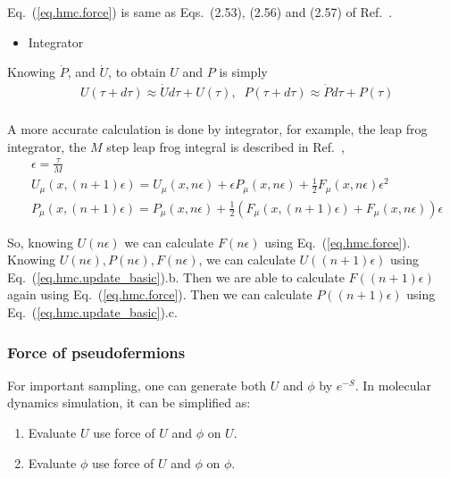 Eq.~(\ref{eq.hmc.force}) is same as Eqs.~(2.53), (2.56) and (2.57) of Ref.~\cite{latticeqcdbook2017}.

\begin{itemize}
\item {}Integrator
\end{itemize}

Knowing $\dot{P}$, and $\dot {U}$, to obtain $U$ and $P$ is simply
\begin{equation}
\begin{split}
&U(\tau+d\tau)\approx \dot{U}d\tau + U(\tau),\;\;P(\tau+d\tau)\approx \dot{P}d\tau + P(\tau)\\
\end{split}
\end{equation}

A more accurate calculation is done by integrator, for example, the leap frog integrator, the $M$ step leap frog integral is described in Ref.~\cite{latticeqcdbook2010},
\begin{subequations}
\begin{eqnarray}
&\epsilon = \frac{\tau}{M}\\
&U_{\mu}(x,(n+1)\epsilon)=U_{\mu}(x,n\epsilon)+\epsilon P_{\mu}(x,n\epsilon)+\frac{1}{2}F_{\mu}(x,n\epsilon)\epsilon ^2\\
&P_{\mu}(x,(n+1)\epsilon)=P_{\mu}(x,n\epsilon)+\frac{1}{2}\left(F_{\mu}(x,(n+1)\epsilon)+F_{\mu}(x,n\epsilon)\right)\epsilon
\end{eqnarray}
\label{eq.hmc.update_basic}
\end{subequations}

So, knowing $U(n\epsilon)$ we can calculate $F(n\epsilon)$ using Eq.~(\ref{eq.hmc.force}).
Knowing $U(n\epsilon),P(n\epsilon),F(n\epsilon)$, we can calculate $U((n+1)\epsilon)$ using Eq.~(\ref{eq.hmc.update_basic}).b.
Then we are able to calculate $F((n+1)\epsilon)$ again using Eq.~(\ref{eq.hmc.force}).
Then we can calculate $P((n+1)\epsilon)$ using Eq.~(\ref{eq.hmc.update_basic}).c.

\subsubsection{\label{sec:forceOfPseudofermions}Force of pseudofermions}

For important sampling, one can generate both $U$ and $\phi$ by $e^{-S}$. In molecular dynamics simulation, it can be simplified as:

\begin{enumerate}
  \item Evaluate $U$ use force of $U$ and $\phi$ on $U$.
  \item Evaluate $\phi$ use force of $U$ and $\phi$ on $\phi$.
\end{enumerate}

